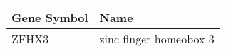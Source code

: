 \begin{tabular}{ll}
\toprule
Gene Symbol &                   Name \\
\midrule
      ZFHX3 & zinc finger homeobox 3 \\
\bottomrule
\end{tabular}
